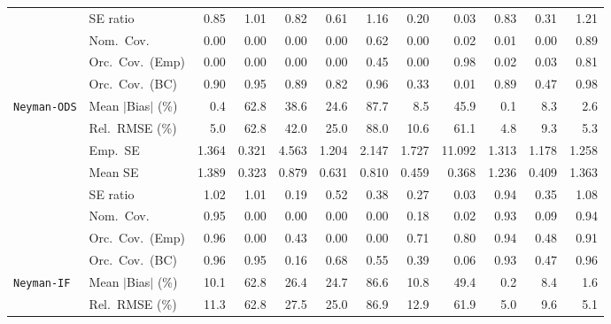 \begin{landscape}
\begin{longtable}{llrrrrrrrrrr}
 & SE ratio & \cellcolor{ranktwo}0.85 & \cellcolor{rankone}1.01 & 0.82 & 0.61 & \cellcolor{rankthree}1.16 & 0.20 & 0.03 & 0.83 & 0.31 & 1.21 \\
 & Nom.\ Cov. & 0.00 & 0.00 & 0.00 & 0.00 & \cellcolor{ranktwo}0.62 & 0.00 & \cellcolor{rankthree}0.02 & 0.01 & 0.00 & \cellcolor{rankone}0.89 \\
 & Orc.\ Cov.\ (Emp) & 0.00 & 0.00 & 0.00 & 0.00 & \cellcolor{rankthree}0.45 & 0.00 & \cellcolor{rankone}0.98 & 0.02 & 0.03 & \cellcolor{ranktwo}0.81 \\
 & Orc.\ Cov.\ (BC) & 0.90 & \cellcolor{rankone}0.95 & 0.89 & 0.82 & \cellcolor{ranktwo}0.96 & 0.33 & 0.01 & 0.89 & 0.47 & \cellcolor{rankthree}0.98 \\
\addlinespace[2pt]
\quad \texttt{Neyman-ODS} & Mean $|$Bias$|$ (\%) & \cellcolor{ranktwo}0.4 & 62.8 & 38.6 & 24.6 & 87.7 & 8.5 & 45.9 & \cellcolor{rankone}0.1 & 8.3 & \cellcolor{rankthree}2.6 \\
 & Rel.\ RMSE (\%) & \cellcolor{ranktwo}5.0 & 62.8 & 42.0 & 25.0 & 88.0 & 10.6 & 61.1 & \cellcolor{rankone}4.8 & 9.3 & \cellcolor{rankthree}5.3 \\
 & Emp.\ SE & 1.364 & 0.321 & 4.563 & 1.204 & 2.147 & 1.727 & 11.092 & 1.313 & 1.178 & 1.258 \\
 & Mean SE & 1.389 & 0.323 & 0.879 & 0.631 & 0.810 & 0.459 & 0.368 & 1.236 & 0.409 & 1.363 \\
 & SE ratio & \cellcolor{ranktwo}1.02 & \cellcolor{rankone}1.01 & 0.19 & 0.52 & 0.38 & 0.27 & 0.03 & \cellcolor{rankthree}0.94 & 0.35 & 1.08 \\
 & Nom.\ Cov. & \cellcolor{rankone}0.95 & 0.00 & 0.00 & 0.00 & 0.00 & 0.18 & 0.02 & \cellcolor{rankthree}0.93 & 0.09 & \cellcolor{ranktwo}0.94 \\
 & Orc.\ Cov.\ (Emp) & \cellcolor{rankone}0.96 & 0.00 & 0.43 & 0.00 & 0.00 & 0.71 & 0.80 & \cellcolor{ranktwo}0.94 & 0.48 & \cellcolor{rankthree}0.91 \\
 & Orc.\ Cov.\ (BC) & \cellcolor{ranktwo}0.96 & \cellcolor{rankone}0.95 & 0.16 & 0.68 & 0.55 & 0.39 & 0.06 & 0.93 & 0.47 & \cellcolor{rankthree}0.96 \\
\addlinespace[2pt]
\quad \texttt{Neyman-IF} & Mean $|$Bias$|$ (\%) & 10.1 & 62.8 & 26.4 & 24.7 & 86.6 & 10.8 & 49.4 & \cellcolor{rankone}0.2 & \cellcolor{rankthree}8.4 & \cellcolor{ranktwo}1.6 \\
 & Rel.\ RMSE (\%) & 11.3 & 62.8 & 27.5 & 25.0 & 86.9 & 12.9 & 61.9 & \cellcolor{rankone}5.0 & \cellcolor{rankthree}9.6 & \cellcolor{ranktwo}5.1 \\

\end{longtable}
\end{landscape}
